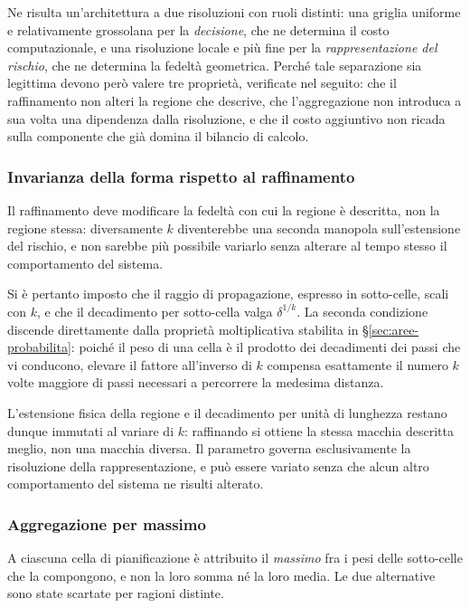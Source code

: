Ne risulta un'architettura a due risoluzioni con ruoli distinti: una griglia uniforme e
relativamente grossolana per la \emph{decisione}, che ne determina il costo computazionale, e
una risoluzione locale e più fine per la \emph{rappresentazione del rischio}, che ne determina
la fedeltà geometrica. Perché tale separazione sia legittima devono però valere tre proprietà,
verificate nel seguito: che il raffinamento non alteri la regione che descrive, che
l'aggregazione non introduca a sua volta una dipendenza dalla risoluzione, e che il costo
aggiuntivo non ricada sulla componente che già domina il bilancio di calcolo.

\subsubsection{Invarianza della forma rispetto al raffinamento}

Il raffinamento deve modificare la fedeltà con cui la regione è descritta, non la regione
stessa: diversamente $k$ diventerebbe una seconda manopola sull'estensione del rischio, e non
sarebbe più possibile variarlo senza alterare al tempo stesso il comportamento del sistema.

Si è pertanto imposto che il raggio di propagazione, espresso in sotto-celle, scali con $k$, e
che il decadimento per sotto-cella valga $\delta^{1/k}$. La seconda condizione discende
direttamente dalla proprietà moltiplicativa stabilita in \S\ref{sec:aree-probabilita}: poiché
il peso di una cella è il prodotto dei decadimenti dei passi che vi conducono, elevare il
fattore all'inverso di $k$ compensa esattamente il numero $k$ volte maggiore di passi
necessari a percorrere la medesima distanza.

L'estensione fisica della regione e il decadimento per unità di lunghezza restano dunque
immutati al variare di $k$: raffinando si ottiene la stessa macchia descritta meglio, non una
macchia diversa. Il parametro governa esclusivamente la risoluzione della rappresentazione, e
può essere variato senza che alcun altro comportamento del sistema ne risulti alterato.

\subsubsection{Aggregazione per massimo}

A ciascuna cella di pianificazione è attribuito il \emph{massimo} fra i pesi delle sotto-celle
che la compongono, e non la loro somma né la loro media. Le due alternative sono state
scartate per ragioni distinte.

